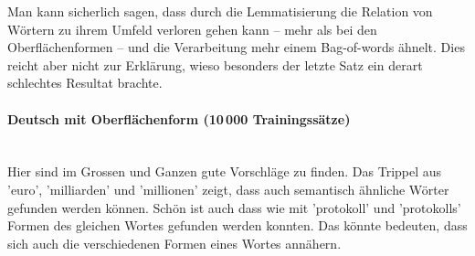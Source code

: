 \documentclass[11pt,twoside,openright]{mpreport}
\begin{document}
Man kann sicherlich sagen, dass durch die Lemmatisierung die Relation von Wörtern zu ihrem Umfeld verloren gehen kann -- mehr als bei den Oberflächenformen -- und die Verarbeitung mehr einem Bag-of-words ähnelt. Dies reicht aber nicht zur Erklärung, wieso besonders der letzte Satz ein derart schlechtes Resultat brachte.

\paragraph{Deutsch mit Oberflächenform (10\,000 Trainingssätze)\\\\}

Hier sind im Grossen und Ganzen gute Vorschläge zu finden. Das Trippel aus 'euro', 'milliarden' und 'millionen' zeigt, dass auch semantisch ähnliche Wörter gefunden werden können. Schön ist auch dass wie mit 'protokoll' und 'protokolls' Formen des gleichen Wortes gefunden werden konnten. Das könnte bedeuten, dass sich auch die verschiedenen Formen eines Wortes annähern.
\end{document}
